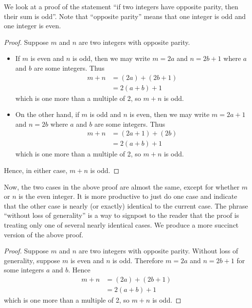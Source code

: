 \begin{example}
    We look at a proof of the statement ``if two integers have opposite parity, then their sum is odd''. Note that ``opposite parity'' means that one integer is odd and one integer is even.
    \begin{proof}
        Suppose $m$ and $n$ are two integers with opposite parity.
        \begin{itemize}
            \item If $m$ is even and $n$ is odd, then we may write $m = 2a$ and $n = 2b + 1$ where $a$ and $b$ are some integers. Thus
            \begin{align*}
                m + n &= (2a) + (2b + 1)\\
                &= 2(a+b) + 1
            \end{align*}
            which is one more than a multiple of 2, so $m + n$ is odd.
            \item On the other hand, if $m$ is odd and $n$ is even, then we may write $m = 2a + 1$ and $n = 2b$ where $a$ and $b$ are some integers. Thus
            \begin{align*}
                m + n &= (2a + 1) + (2b)\\
                &= 2(a+b) + 1
            \end{align*}
            which is one more than a multiple of 2, so $m + n$ is odd.
        \end{itemize}
        Hence, in either case, $m + n$ is odd.
    \end{proof}
\end{example}

Now, the two cases in the above proof are almost the same, except for whether $m$ or $n$ is the even integer. It is more productive to just do one case and indicate that the other case is nearly (or exactly) identical to the current case. The phrase ``without loss of generality'' is a way to signpost to the reader that the proof is treating only one of several nearly identical cases. We produce a more succinct version of the above proof.

\begin{proof}
    Suppose $m$ and $n$ are two integers with opposite parity. Without loss of generality, suppose $m$ is even and $n$ is odd. Therefore $m = 2a$ and $n = 2b + 1$ for some integers $a$ and $b$. Hence
    \begin{align*}
        m + n &= (2a) + (2b + 1)\\
        &= 2(a+b) + 1
    \end{align*}
    which is one more than a multiple of 2, so $m + n$ is odd.
\end{proof}

